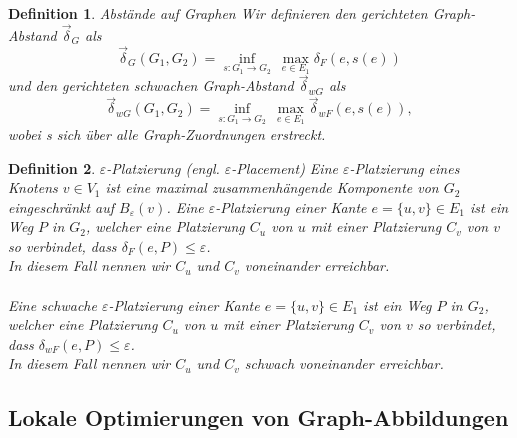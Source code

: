 \documentclass[a4paper, 12pt, twoside]{article}
\theoremstyle{Format1} %
\newtheorem{Def}{Definition}[section]       %
\begin{document}
\begin{Def}
	Abstände auf Graphen
	Wir definieren den \textit{gerichteten Graph-Abstand} $ \vec{\delta}_G $ als
	$$ \vec{\delta}_G(G_1,G_2) = \inf_{s: G_1 \to G_2} \: \max_{e \in E_1} \delta_F(e, s(e)) $$
	und den \textit{gerichteten schwachen Graph-Abstand} $ \vec{\delta}_{wG} $ als
	$$  \vec{\delta}_{wG}(G_1,G_2) = \inf_{s: G_1 \to G_2} \: \max_{e \in E_1} \vec{\delta}_{wF}(e, s(e)), $$
	wobei s sich über alle Graph-Zuordnungen erstreckt.
\end{Def}

\begin{Def}
	$\varepsilon$-Platzierung (engl. $\varepsilon$-Placement)
	Eine \textit{$\varepsilon$-Platzierung eines Knotens $v \in V_1$} ist eine maximal zusammenhängende Komponente von $G_2$ eingeschränkt auf $B_{\varepsilon}(v)$.
	Eine \textit{$\varepsilon$-Platzierung einer Kante $e = \{u,v\} \in E_1$} ist ein Weg $P$ in $G_2$, welcher eine Platzierung $C_u$ von $u$ mit einer Platzierung $C_v$ von $v$
	so verbindet, dass $\delta_F(e, P) \leq \varepsilon$.
	\\
	In diesem Fall nennen wir $C_u$ und $C_v$ \textit{voneinander erreichbar}.
	\\
	\\
	Eine schwache $\varepsilon$-Platzierung einer Kante $e = \{u,v\} \in E_1$ ist ein Weg $P$ in $G_2$, welcher eine Platzierung $C_u$ von $u$ mit einer Platzierung $C_v$ von $v$
	so verbindet, dass $\delta_{wF}(e, P) \leq \varepsilon$.
	\\
	In diesem Fall nennen wir $C_u$ und $C_v$ \textit{schwach voneinander erreichbar}.
\end{Def}

\subsection{Lokale Optimierungen von Graph-Abbildungen}
\end{document}

